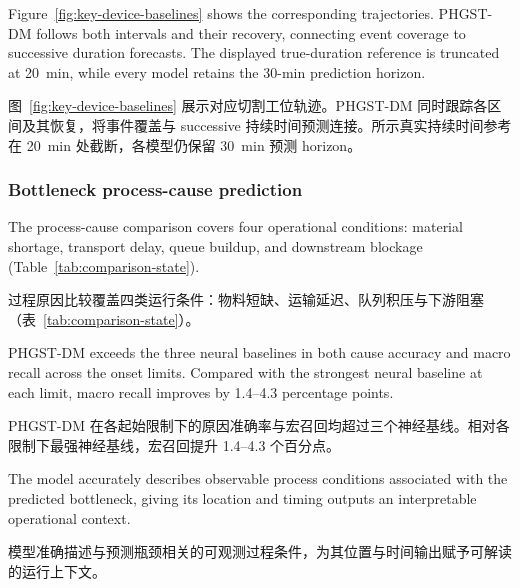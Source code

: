\documentclass[a4paper,fleqn]{cas-dc}
\newcommand{\zhpara}[1]{%
  \par\begingroup\small\color{black!72}\noindent #1\par\endgroup}
\begin{document}
Figure~\ref{fig:key-device-baselines} shows the corresponding trajectories. PHGST-DM follows both intervals and their recovery, connecting event coverage to successive duration forecasts. The displayed true-duration reference is truncated at 20~min, while every model retains the 30-min prediction horizon.

\zhpara{图~\ref{fig:key-device-baselines} 展示对应切割工位轨迹。PHGST-DM 同时跟踪各区间及其恢复，将事件覆盖与 successive 持续时间预测连接。所示真实持续时间参考在 20~min 处截断，各模型仍保留 30~min 预测 horizon。}




\subsubsection{Bottleneck process-cause prediction}\label{sec:comparison-cause}

The process-cause comparison covers four operational conditions: material shortage, transport delay, queue buildup, and downstream blockage (Table~\ref{tab:comparison-state}).

\zhpara{过程原因比较覆盖四类运行条件：物料短缺、运输延迟、队列积压与下游阻塞（表~\ref{tab:comparison-state}）。}


PHGST-DM exceeds the three neural baselines in both cause accuracy and macro recall across the onset limits. Compared with the strongest neural baseline at each limit, macro recall improves by 1.4--4.3 percentage points.

\zhpara{PHGST-DM 在各起始限制下的原因准确率与宏召回均超过三个神经基线。相对各限制下最强神经基线，宏召回提升 1.4--4.3 个百分点。}


The model accurately describes observable process conditions associated with the predicted bottleneck, giving its location and timing outputs an interpretable operational context.

\zhpara{模型准确描述与预测瓶颈相关的可观测过程条件，为其位置与时间输出赋予可解读的运行上下文。}
\end{document}
